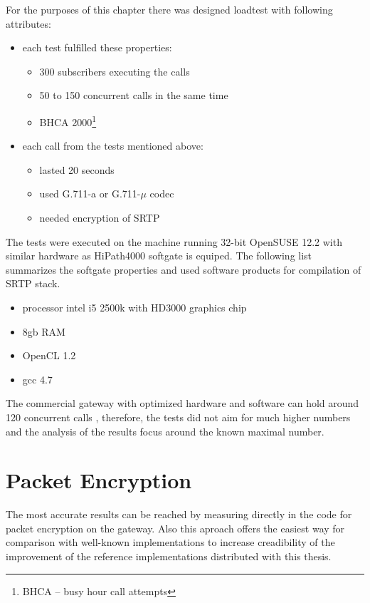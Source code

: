 For the purposes of this chapter there was designed loadtest with following
attributes:
\begin{itemize}
\item each test fulfilled these properties:
\vspace{-0.5em}
\begin{itemize}
\item 300 subscribers executing the calls
\item 50 to 150 concurrent calls in the same time\cite{hp4k}
\item BHCA 2000\footnote{ BHCA -- busy hour call attempts}
\end{itemize}
\item each call from the tests mentioned above:
\vspace{-0.5em}
\begin{itemize}
\item lasted 20 seconds
\item used G.711-a or G.711-$\mu$ codec
\item needed encryption of SRTP
\end{itemize}
\end{itemize}


The tests were executed on the machine running 32-bit OpenSUSE 12.2 with similar
hardware as HiPath4000 softgate is equiped. The following list summarizes the
softgate properties and used software products for compilation of SRTP stack.
\begin{itemize}
\item processor intel i5 2500k with HD3000 graphics chip
\item 8gb RAM
\item OpenCL 1.2
\item gcc 4.7
\end{itemize}
 
The commercial gateway with optimized hardware and software can hold around 120 
concurrent calls \cite{hp4k}, therefore, the tests did not aim for much higher
numbers and the analysis of the results focus around the known maximal number. 

\section{Packet Encryption}
The most accurate results can be reached by measuring directly in the code for
packet encryption on the gateway. Also this aproach offers the easiest way
for comparison with well-known implementations to increase creadibility of 
the improvement of the reference implementations distributed with this thesis. 

